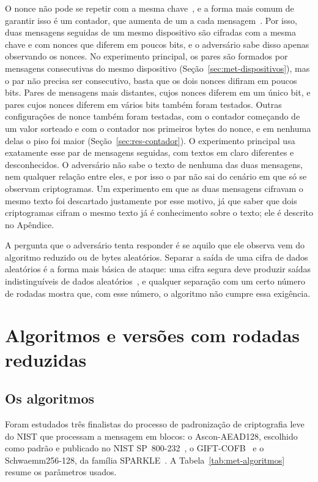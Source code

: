 O nonce não pode se repetir com a mesma chave~\cite{Rogaway2004Nonce,nist_sp800232_2025}, e a forma mais comum de garantir isso é um contador, que aumenta de um a cada mensagem~\cite{NISTSP80038D}. Por isso, duas mensagens seguidas de um mesmo dispositivo são cifradas com a mesma chave e com nonces que diferem em poucos bits, e o adversário sabe disso apenas observando os nonces. No experimento principal, os pares são formados por mensagens consecutivas do mesmo dispositivo (Seção~\ref{sec:met-dispositivos}), mas o par não precisa ser consecutivo, basta que os dois nonces difiram em poucos bits. Pares de mensagens mais distantes, cujos nonces diferem em um único bit, e pares cujos nonces diferem em vários bits também foram testados. Outras configurações de nonce também foram testadas, com o contador começando de um valor sorteado e com o contador nos primeiros bytes do nonce, e em nenhuma delas o piso foi maior (Seção~\ref{sec:res-contador}). O experimento principal usa exatamente esse par de mensagens seguidas, com textos em claro diferentes e desconhecidos. O adversário não sabe o texto de nenhuma das duas mensagens, nem qualquer relação entre eles, e por isso o par não sai do cenário em que só se observam criptogramas. Um experimento em que as duas mensagens cifravam o mesmo texto foi descartado justamente por esse motivo, já que saber que dois criptogramas cifram o mesmo texto já é conhecimento sobre o texto; ele é descrito no Apêndice.

A pergunta que o adversário tenta responder é se aquilo que ele observa vem do algoritmo reduzido ou de bytes aleatórios. Separar a saída de uma cifra de dados aleatórios é a forma mais básica de ataque: uma cifra segura deve produzir saídas indistinguíveis de dados aleatórios~\cite{GoldwasserMicali1984PE,KatzLindell2014IMC}, e qualquer separação com um certo número de rodadas mostra que, com esse número, o algoritmo não cumpre essa exigência.

\section{Algoritmos e versões com rodadas reduzidas}
\label{sec:met-algoritmos}

\subsection{Os algoritmos}
\label{sec:met-algoritmos-lista}

Foram estudados três finalistas do processo de padronização de criptografia leve do NIST que processam a mensagem em blocos: o Ascon-AEAD128, escolhido como padrão e publicado no NIST SP~800-232~\cite{nist_sp800232_2025}, o GIFT-COFB~\cite{Banik2021} e o Schwaemm256-128, da família SPARKLE~\cite{Beierle2020Sparkle}. A Tabela~\ref{tab:met-algoritmos} resume os parâmetros usados.

